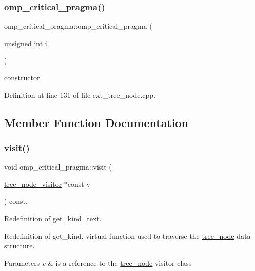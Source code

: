\subsubsection{\texorpdfstring{omp\+\_\+critical\+\_\+pragma()}{omp\_critical\_pragma()}}
{\footnotesize\ttfamily omp\+\_\+critical\+\_\+pragma\+::omp\+\_\+critical\+\_\+pragma (\begin{DoxyParamCaption}\item[{unsigned int}]{i }\end{DoxyParamCaption})\hspace{0.3cm}{\ttfamily [explicit]}}



constructor 



Definition at line 131 of file ext\+\_\+tree\+\_\+node.\+cpp.



\subsection{Member Function Documentation}
\mbox{\label{structomp__critical__pragma_afb58812bf6b4658b1085d45711b25847}} 
\subsubsection{\texorpdfstring{visit()}{visit()}}
{\footnotesize\ttfamily void omp\+\_\+critical\+\_\+pragma\+::visit (\begin{DoxyParamCaption}\item[{\hyperlink{classtree__node__visitor}{tree\+\_\+node\+\_\+visitor} $\ast$const}]{v }\end{DoxyParamCaption}) const\hspace{0.3cm}{\ttfamily [override]}, {\ttfamily [virtual]}}



Redefinition of get\+\_\+kind\+\_\+text. 

Redefinition of get\+\_\+kind. virtual function used to traverse the \hyperlink{classtree__node}{tree\+\_\+node} data structure. 
\begin{DoxyParams}{Parameters}
{\em v} & is a reference to the \hyperlink{classtree__node}{tree\+\_\+node} visitor class \\
\hline
\end{DoxyParams}



